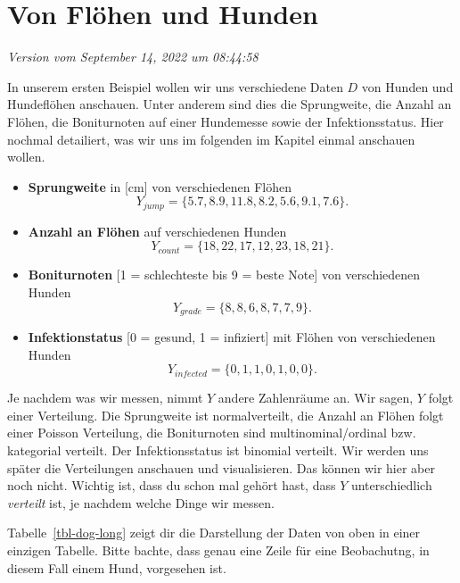 \documentclass[
  letterpaper,
]{scrbook}
\begin{document}
\hypertarget{sec-example-1}{%
\chapter{Von Flöhen und Hunden}\label{sec-example-1}}

\emph{Version vom September 14, 2022 um 08:44:58}

In unserem ersten Beispiel wollen wir uns verschiedene Daten \(D\) von
Hunden und Hundeflöhen anschauen. Unter anderem sind dies die
Sprungweite, die Anzahl an Flöhen, die Boniturnoten auf einer Hundemesse
sowie der Infektionsstatus. Hier nochmal detailiert, was wir uns im
folgenden im Kapitel einmal anschauen wollen.

\begin{itemize}
\item
  \textbf{Sprungweite} in {[}cm{]} von verschiedenen Flöhen \[
  Y_{jump} = \{5.7, 8.9, 11.8, 8.2, 5.6, 9.1, 7.6\}.
  \]
\item
  \textbf{Anzahl an Flöhen} auf verschiedenen Hunden \[
    Y_{count} = \{18, 22, 17, 12, 23, 18, 21\}.
    \]
\item
  \textbf{Boniturnoten} {[}1 = schlechteste bis 9 = beste Note{]} von
  verschiedenen Hunden \[
    Y_{grade} = \{8, 8, 6, 8, 7, 7, 9\}.
    \]
\item
  \textbf{Infektionstatus} {[}0 = gesund, 1 = infiziert{]} mit Flöhen
  von verschiedenen Hunden \[
    Y_{infected} = \{0, 1, 1, 0, 1, 0, 0\}.
    \]
\end{itemize}

Je nachdem was wir messen, nimmt \(Y\) andere Zahlenräume an. Wir sagen,
\(Y\) folgt einer Verteilung. Die Sprungweite ist normalverteilt, die
Anzahl an Flöhen folgt einer Poisson Verteilung, die Boniturnoten sind
multinominal/ordinal bzw. kategorial verteilt. Der Infektionsstatus ist
binomial verteilt. Wir werden uns später die Verteilungen anschauen und
visualisieren. Das können wir hier aber noch nicht. Wichtig ist, dass du
schon mal gehört hast, dass \(Y\) unterschiedlich \emph{verteilt} ist,
je nachdem welche Dinge wir messen.

Tabelle~\ref{tbl-dog-long} zeigt dir die Darstellung der Daten von oben
in einer einzigen Tabelle. Bitte bachte, dass genau eine Zeile für eine
Beobachutng, in diesem Fall einem Hund, vorgesehen ist.
\end{document}
